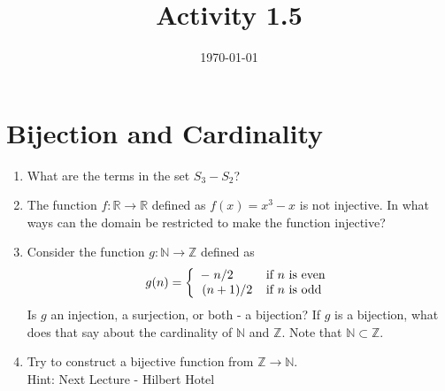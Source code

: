 \documentclass[12pt]{amsart}
\title{Activity 1.5}
\date{\today}
\begin{document}
\maketitle
\part*{Bijection and Cardinality}
\begin{enumerate}
\item What are the terms in the set $S_3 - S_2$?
\item The function $f: \mathbb{R} \to \mathbb{R}$ defined as $f(x) = x^3 - x$ is not injective. In what ways can the domain be restricted to make the function injective?
\item Consider the function $g: \mathbb{N} \to \mathbb{Z}$ defined as 
\begin{equation*}
g(n) = \left\{
    \begin{array}{ll}
        -\flatfrac{n}{2} & \text{if } n \text{ is even}\\
        \flatfrac{(n+1)}{2} & \text{if } n \text{ is odd}
    \end{array} 
    \right.
\end{equation*}
Is $g$ an injection, a surjection, or both - a bijection? If $g$ is a bijection, what does that say about the cardinality of $\mathbb{N}$ and $\mathbb{Z}$. Note that $\mathbb{N} \subset \mathbb{Z}$.
\item Try to construct a bijective function from $\mathbb{Z} \to \mathbb{N}$.\\
Hint: Next Lecture -  Hilbert Hotel
\end{enumerate}  
\end{document}
